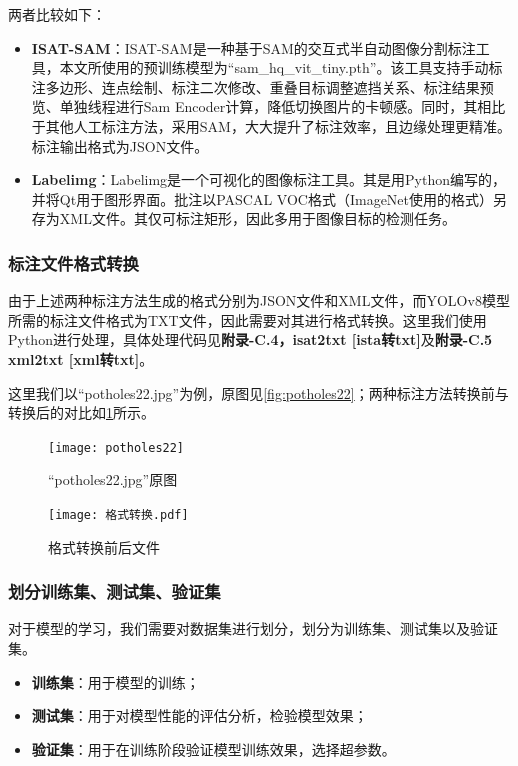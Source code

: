 \documentclass{MathorCupmodeling}
\begin{document}
	两者比较如下：
	\begin{itemize}
		\item \textbf{ISAT-SAM}：ISAT-SAM是一种基于SAM的交互式半自动图像分割标注工具，本文所使用的预训练模型为“sam\_hq\_vit\_tiny.pth”。该工具支持手动标注多边形、连点绘制、标注二次修改、重叠目标调整遮挡关系、标注结果预览、单独线程进行Sam Encoder计算，降低切换图片的卡顿感\textcolor{blue}{\cite{ISAT-SAM}}。同时，其相比于其他人工标注方法，采用SAM，大大提升了标注效率，且边缘处理更精准。标注输出格式为JSON文件。
		\item \textbf{Labelimg}：Labelimg是一个可视化的图像标注工具。其是用Python编写的，并将Qt用于图形界面。批注以PASCAL VOC格式（ImageNet使用的格式）另存为XML文件\textcolor{blue}{\cite{Labelimg}}。其仅可标注矩形，因此多用于图像目标的检测任务。
	\end{itemize}
	\subsubsection{标注文件格式转换}
	由于上述两种标注方法生成的格式分别为JSON文件和XML文件，而YOLOv8模型所需的标注文件格式为TXT文件，因此需要对其进行格式转换。这里我们使用Python进行处理，具体处理代码见\textbf{附录-C.4，isat2txt [ista转txt]}及\textbf{附录-C.5 xml2txt [xml转txt]}。

	这里我们以“potholes22.jpg”为例，原图见\textcolor{blue}{\cref{fig:potholes22}}；两种标注方法转换前与转换后的对比如\textcolor{blue}{\cref{fig:格式转换}}所示。
	\begin{figure}[H]
		\centering
		\begin{minipage}{0.45\linewidth}
		  \centering
		  \texttt{[image: potholes22]}
		  \caption{“potholes22.jpg”原图}
		  \label{fig:potholes22}
		\end{minipage}
		\begin{minipage}{0.45\linewidth}
		  \centering
		  \texttt{[image: 格式转换.pdf]}
		  \caption{格式转换前后文件}
		  \label{fig:格式转换}
		\end{minipage}
	\end{figure}

	\subsubsection{划分训练集、测试集、验证集}
	对于模型的学习，我们需要对数据集进行划分，划分为训练集、测试集以及验证集。
	\begin{itemize}
		\item \textbf{训练集}：用于模型的训练；
		\item \textbf{测试集}：用于对模型性能的评估分析，检验模型效果；
		\item \textbf{验证集}：用于在训练阶段验证模型训练效果，选择超参数。
	\end{itemize}
	
\end{document}
